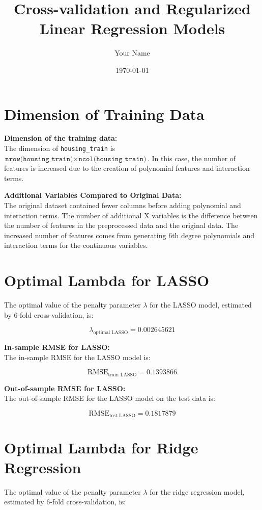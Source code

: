 \documentclass{article}
\title{Cross-validation and Regularized Linear Regression Models}
\author{Your Name}
\date{\today}
\begin{document}
\maketitle

\section*{Dimension of Training Data}


\textbf{Dimension of the training data:} \\
The dimension of \texttt{housing\_train} is \( \texttt{nrow(housing\_train)} \times \texttt{ncol(housing\_train)} \). In this case, the number of features is increased due to the creation of polynomial features and interaction terms.

\textbf{Additional Variables Compared to Original Data:} \\
The original dataset contained fewer columns before adding polynomial and interaction terms. The number of additional X variables is the difference between the number of features in the preprocessed data and the original data. The increased number of features comes from generating 6th degree polynomials and interaction terms for the continuous variables.

\section*{Optimal Lambda for LASSO}

The optimal value of the penalty parameter \( \lambda \) for the LASSO model, estimated by 6-fold cross-validation, is:

\[
\lambda_{\text{optimal LASSO}} = 0.002645621
\]

\textbf{In-sample RMSE for LASSO:} \\
The in-sample RMSE for the LASSO model is:

\[
\text{RMSE}_{\text{train LASSO}} = 0.1393866
\]

\textbf{Out-of-sample RMSE for LASSO:} \\
The out-of-sample RMSE for the LASSO model on the test data is:

\[
\text{RMSE}_{\text{test LASSO}} = 0.1817879
\]

\section*{Optimal Lambda for Ridge Regression}

The optimal value of the penalty parameter \( \lambda \) for the ridge regression model, estimated by 6-fold cross-validation, is:
\end{document}
